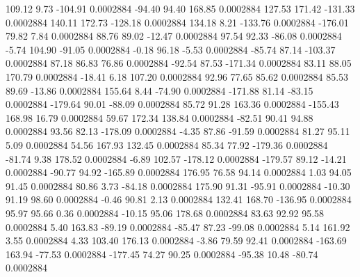       109.12        9.73     -104.91     0.0002884
      -94.40       94.40      168.85     0.0002884
      127.53      171.42     -131.33     0.0002884
      140.11      172.73     -128.18     0.0002884
      134.18        8.21     -133.76     0.0002884
     -176.01       79.82        7.84     0.0002884
       88.76       89.02      -12.47     0.0002884
       97.54       92.33      -86.08     0.0002884
       -5.74      104.90      -91.05     0.0002884
       -0.18       96.18       -5.53     0.0002884
      -85.74       87.14     -103.37     0.0002884
       87.18       86.83       76.86     0.0002884
      -92.54       87.53     -171.34     0.0002884
       83.11       88.05      170.79     0.0002884
      -18.41        6.18      107.20     0.0002884
       92.96       77.65       85.62     0.0002884
       85.53       89.69      -13.86     0.0002884
      155.64        8.44      -74.90     0.0002884
     -171.88       81.14      -83.15     0.0002884
     -179.64       90.01      -88.09     0.0002884
       85.72       91.28      163.36     0.0002884
     -155.43      168.98       16.79     0.0002884
       59.67      172.34      138.84     0.0002884
      -82.51       90.41       94.88     0.0002884
       93.56       82.13     -178.09     0.0002884
       -4.35       87.86      -91.59     0.0002884
       81.27       95.11        5.09     0.0002884
       54.56      167.93      132.45     0.0002884
       85.34       77.92     -179.36     0.0002884
      -81.74        9.38      178.52     0.0002884
       -6.89      102.57     -178.12     0.0002884
     -179.57       89.12      -14.21     0.0002884
      -90.77       94.92     -165.89     0.0002884
      176.95       76.58       94.14     0.0002884
        1.03       94.05       91.45     0.0002884
       80.86        3.73      -84.18     0.0002884
      175.90       91.31      -95.91     0.0002884
      -10.30       91.19       98.60     0.0002884
       -0.46       90.81        2.13     0.0002884
      132.41      168.70     -136.95     0.0002884
       95.97       95.66        0.36     0.0002884
      -10.15       95.06      178.68     0.0002884
       83.63       92.92       95.58     0.0002884
        5.40      163.83      -89.19     0.0002884
      -85.47       87.23      -99.08     0.0002884
        5.14      161.92        3.55     0.0002884
        4.33      103.40      176.13     0.0002884
       -3.86       79.59       92.41     0.0002884
     -163.69      163.94      -77.53     0.0002884
     -177.45       74.27       90.25     0.0002884
      -95.38       10.48      -80.74     0.0002884
